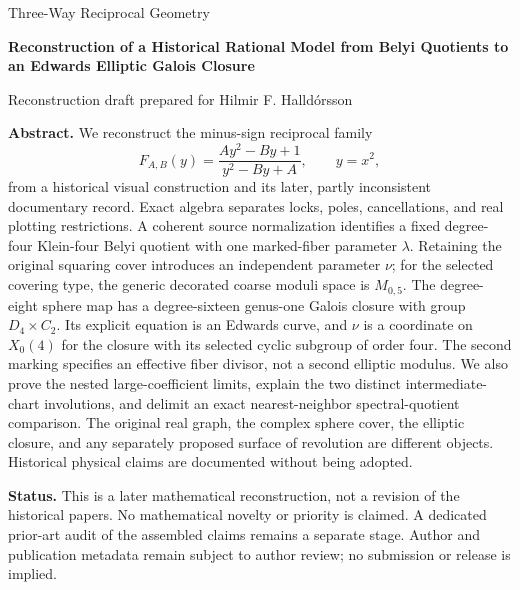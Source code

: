 \documentclass[11pt,a4paper]{article}
\numberwithin{equation}{section}
\begin{document}
\hypersetup{pageanchor=false}
\begin{titlepage}
\centering\vspace*{18mm}
{\Large Three-Way Reciprocal Geometry\par}\vspace{7mm}
{\LARGE\bfseries Reconstruction of a Historical Rational Model from Belyi Quotients to an Edwards Elliptic Galois Closure\par}
\vspace{15mm}
{\large Reconstruction draft prepared for Hilmir F. Halldórsson\par}
\vspace{3mm}{with Codex assistance\par}
\vspace{8mm}{Version 0.1 \quad 5 October 2026\par}
\vspace{12mm}
\begin{minipage}{.91\textwidth}
\textbf{Abstract.} We reconstruct the minus-sign reciprocal family
\[
F_{A,B}(y)=\frac{Ay^2-By+1}{y^2-By+A},\qquad y=x^2,
\]
from a historical visual construction and its later, partly inconsistent documentary record. Exact algebra separates locks, poles, cancellations, and real plotting restrictions. A coherent source normalization identifies a fixed degree-four Klein-four Belyi quotient with one marked-fiber parameter \(\lambda\). Retaining the original squaring cover introduces an independent parameter \(\nu\); for the selected covering type, the generic decorated coarse moduli space is \(M_{0,5}\). The degree-eight sphere map has a degree-sixteen genus-one Galois closure with group \(D_4\times C_2\). Its explicit equation is an Edwards curve, and \(\nu\) is a coordinate on \(X_0(4)\) for the closure with its selected cyclic subgroup of order four. The second marking specifies an effective fiber divisor, not a second elliptic modulus. We also prove the nested large-coefficient limits, explain the two distinct intermediate-chart involutions, and delimit an exact nearest-neighbor spectral-quotient comparison. The original real graph, the complex sphere cover, the elliptic closure, and any separately proposed surface of revolution are different objects. Historical physical claims are documented without being adopted.
\end{minipage}
\vfill
\begin{minipage}{.91\textwidth}\small
\textbf{Status.} This is a later mathematical reconstruction, not a revision of the historical papers. No mathematical novelty or priority is claimed. A dedicated prior-art audit of the assembled claims remains a separate stage. Author and publication metadata remain subject to author review; no submission or release is implied.
\end{minipage}
\end{titlepage}
\hypersetup{pageanchor=true}
\tableofcontents\clearpage{}





\appendix

\clearpage
{}

\end{document}

